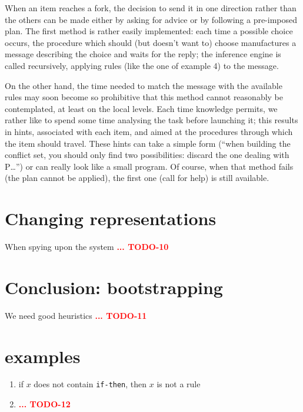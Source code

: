\documentclass[11pt,a4paper,svgnames]{article}
\begin{document}
  When an item reaches a fork, the decision to send it in one direction rather
  than the others can be made either by asking for advice or by following a
  pre-imposed plan. The first method is rather easily implemented: each time a
  possible choice occurs, the procedure which should (but doesn't want to) choose
  manufactures a message describing the choice and waits for the reply; the
  inference engine is called recursively, applying rules (like the one of example
  4) to the message.

  On the other hand, the time needed to match the message with the available
  rules may soon become so prohibitive that this method cannot reasonably be
  contemplated, at least on the local levels. Each time knowledge permits, we
  rather like to spend some time analysing the task before launching it; this
  results in hints, associated with each item, and aimed at the procedures
  through which the item should travel. These hints can take a simple form
  (``when building the conflict set, you should only find two possibilities:
  discard the one dealing with P\ldots'') or can really look like a small program.
  Of course, when that method fails (the plan cannot be applied), the first one
  (call for help) is still available.

  \section{Changing representations}
  \label{sec:changing-repr}
  When spying upon the system
  {\textcolor{red}{\textbf{... TODO-10}}}

  \section{Conclusion: bootstrapping}
  \label{sec:concl-bootstrap}
  We need good heuristics
  {\textcolor{red}{\textbf{... TODO-11}}}

  \section*{examples}
  \label{sec:examples}

  \begin{enumerate}
  \item if $x$ does not contain \texttt{if-then}, then $x$ is not a rule
    \item
      {\textcolor{red}{\textbf{... TODO-12}}}

  \end{enumerate}

\clearpage
{}



\end{document}
